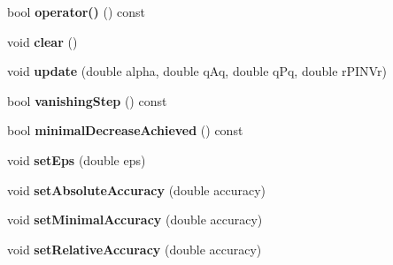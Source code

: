 \begin{DoxyCompactItemize}
\item 
bool {\bfseries operator()} () const \hypertarget{classSpacy_1_1CG_1_1TerminationCriterion_ab109eb287dd3622db54bbbdf0a55660a}{}\label{classSpacy_1_1CG_1_1TerminationCriterion_ab109eb287dd3622db54bbbdf0a55660a}

\item 
void {\bfseries clear} ()\hypertarget{classSpacy_1_1CG_1_1TerminationCriterion_a347651c14a38ce3bf1c92454aded97ab}{}\label{classSpacy_1_1CG_1_1TerminationCriterion_a347651c14a38ce3bf1c92454aded97ab}

\item 
void {\bfseries update} (double alpha, double q\+Aq, double q\+Pq, double r\+P\+I\+N\+Vr)\hypertarget{classSpacy_1_1CG_1_1TerminationCriterion_a4ef7ad43f594bab9b21f60e36697c516}{}\label{classSpacy_1_1CG_1_1TerminationCriterion_a4ef7ad43f594bab9b21f60e36697c516}

\item 
bool {\bfseries vanishing\+Step} () const \hypertarget{classSpacy_1_1CG_1_1TerminationCriterion_ab92b8e27edb8290ed34c34a242f900d3}{}\label{classSpacy_1_1CG_1_1TerminationCriterion_ab92b8e27edb8290ed34c34a242f900d3}

\item 
bool {\bfseries minimal\+Decrease\+Achieved} () const \hypertarget{classSpacy_1_1CG_1_1TerminationCriterion_a928da2a9183b773ca90477057b3d2b8b}{}\label{classSpacy_1_1CG_1_1TerminationCriterion_a928da2a9183b773ca90477057b3d2b8b}

\item 
void {\bfseries set\+Eps} (double eps)\hypertarget{classSpacy_1_1CG_1_1TerminationCriterion_a59099ba9af213a66a33bb5b7c7061e11}{}\label{classSpacy_1_1CG_1_1TerminationCriterion_a59099ba9af213a66a33bb5b7c7061e11}

\item 
void {\bfseries set\+Absolute\+Accuracy} (double accuracy)\hypertarget{classSpacy_1_1CG_1_1TerminationCriterion_a833711290bf75d7cf7450f163f537510}{}\label{classSpacy_1_1CG_1_1TerminationCriterion_a833711290bf75d7cf7450f163f537510}

\item 
void {\bfseries set\+Minimal\+Accuracy} (double accuracy)\hypertarget{classSpacy_1_1CG_1_1TerminationCriterion_a5e16822944d08001fde24212857f4b2a}{}\label{classSpacy_1_1CG_1_1TerminationCriterion_a5e16822944d08001fde24212857f4b2a}

\item 
void {\bfseries set\+Relative\+Accuracy} (double accuracy)\hypertarget{classSpacy_1_1CG_1_1TerminationCriterion_acea2a40d3f62813a3daa69ebbe8f2d16}{}\label{classSpacy_1_1CG_1_1TerminationCriterion_acea2a40d3f62813a3daa69ebbe8f2d16}


\end{DoxyCompactItemize}
